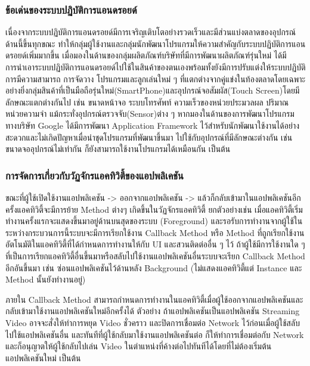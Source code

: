 	\subsubsection{ข้อเด่นของระบบปฏิบัติการแอนดรอยด์} 
	เนื่องจากระบบปฏิบัติการแอนดรอยด์มีการเจริญเติบโตอย่างรวดเร็วและมีส่วนแบ่งตลาดของอุปกรณ์ด้านนี้ขึ้นทุกขณะ ทำให้กลุ่มผู้ใช้งานและกลุ่มนักพัฒนาโปรแกรมให้ความสำคัญกับระบบปฏิบัติการแอนดรอยด์เพิ่มมากขึ้น
	เมื่อมองในด้านของกลุ่มผลิตภัณฑ์บริษัทที่มีการพัฒนาผลิตภัณฑ์รุ่นใหม่ ได้มีการนำเอาระบบปฏิบัติการแอนดรอยด์ไปใช้ในสินค้าของตนเองพร้อมทั้งยังมีการปรับแต่งให้ระบบปฏิบัติการมีความสามารถ การจัดวาง โปรแกรมและลูกเล่นใหม่ ๆ ที่แตกต่างจากคู่แข่งในท้องตลาดโดยเฉพาะอย่างยิ่งกลุ่มสินค้าที่เป็นมือถือรุ่นใหม่(SmartPhone)และอุปกรณ์จอสัมผัส(Touch Screen)โดยมีลักษณะแตกต่างกันไป เช่น ขนาดหน้าจอ ระบบโทรศัพท์ ความเร็วของหน่วยประมวลผล ปริมาณหน่วยความจำ แม้กระทั่งอุปกรณ์ตรวจจับ(Sensor)ต่าง ๆ 
	หากมองในด้านของการพัฒนาโปรแกรม ทางบริษัท Google ได้มีการพัฒนา Application Framework ไว้สำหรับนักพัฒนาใช้งานได้อย่างสะดวกและไม่เกิดปัญหาเมื่อนำชุดโปรแกรมที่พัฒนาขึ้นมา ไปใช้กับอุปกรณ์ที่มีลักษณะต่างกัน เช่น ขนาดจออุปกรณ์ไม่เท่ากัน ก็ยังสามารถใช้งานโปรแกรมได้เหมือนกัน เป็นต้น

	\subsubsection{การจัดการเกี่ยวกับวัฏจักรแอคทิวิตี้ของแอปพลิเคชัน} 
	ขณะที่ผู้ใช้เปิดใช้งานแอปพลิเคชัน -> ออกจากแอปพลิเคชัน -> แล้วก็กลับเข้ามาในแอปพลิเคชันอีกครั้งแอคทิวิตี้จะมีการย้าย Method ต่างๆ เกิดขึ้นในวัฏจักรแอคทิวิตี้ ยกตัวอย่างเช่น 
	เมื่อแอคทิวิตี้เริ่มทำงานครั้งแรกจะแสดงขึ้นมาอยู่ด้านบนสุดของระบบ (Foreground) และรอรับการทำงานจากผู้ใช้ในระหว่างกระบวนการนี้ระบบจะมีการเรียกใช้งาน Callback Method หรือ Method ที่ถูกเรียกใช้งานอัตโนมัติในแอคทิวิตี้ที่ได้กำหนดการทำงานให้กับ UI และสวนติดต่ออื่น ๆ ไว้ ถ้าผู้ใช้มีการใช้งานใด ๆ ที่เป็นการเรียกแอคทิวิตี้อื่นขึ้นมาหรือสลับไปใช้งานแอปพลิเคชันอื่นระบบจะเรียก Callback Method อีกอันขึ้นมา เช่น ซ่อนแอปพลิเคชันไว้ด้านหลัง Background (ไม่แสดงแอคทิวิตี้แต่ Instance และ Method นั้นยังทำงานอยู่)
	
	ภายใน Callback Method สามารถกำหนดการทำงานในแอคทิวิตี้เมื่อผู้ใช้ออกจากแอปพลิเคชันและกลับเข้ามาใช้งานแอปพลิเคชันใหม่อีกครั้งได้ ตัวอย่าง ถ้าแอปพลิเคชันเป็นแอปพลิเคชัน Streaming Video
	อาจจะสั่งให้ทำการหยุด Video ชั่วคราว และปิดการเชื่อมต่อ Network ไว้ก่อนเมื่อผู้ใช้สลับไปใช้แอปพลิเคชันอื่น
	และทันทีที่ผู้ใช้กลับมาใช้งานแอปพลิเคชันต่อ ก็ให้ทำการเชื่อมต่อกับ Network และก็อนุญาตให้ผู้ใช้กลับไปเล่น Video
	ในตำแหน่งที่ค้างต่อไปทันทีได้โดยที่ไม่ต้องเริ่มต้นแอปพลิเคชันใหม่ เป็นต้น
	
